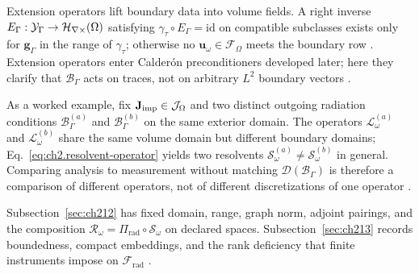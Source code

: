 Extension operators lift boundary data into volume fields. A right inverse \(E_\Gamma:\mathcal{Y}_\Gamma\to\mathcal{H}_{\nabla\times}(\Omega)\) satisfying \(\gamma_\tau\circ E_\Gamma=\mathrm{id}\) on compatible subclasses exists only for \(\mathbf{g}_\Gamma\) in the range of \(\gamma_\tau\); otherwise no \(\mathbf{u}_\omega\in\mathcal{F}_\Omega\) meets the boundary row \cite{stratton1941}. Extension operators enter Calder\'on preconditioners developed later; here they clarify that \(\mathcal{B}_\Gamma\) acts on traces, not on arbitrary \(L^{2}\) boundary vectors \cite{harrington2001}.

As a worked example, fix \(\mathbf{J}_{\mathrm{imp}}\in\mathcal{J}_\Omega\) and two distinct outgoing radiation conditions \(\mathcal{B}_\Gamma^{(a)}\) and \(\mathcal{B}_\Gamma^{(b)}\) on the same exterior domain. The operators \(\mathcal{L}_\omega^{(a)}\) and \(\mathcal{L}_\omega^{(b)}\) share the same volume domain but different boundary domains; Eq.~\eqref{eq:ch2.resolvent-operator} yields two resolvents \(\mathcal{S}_\omega^{(a)}\neq\mathcal{S}_\omega^{(b)}\) in general. Comparing analysis to measurement without matching \(\mathcal{D}(\mathcal{B}_\Gamma)\) is therefore a comparison of different operators, not of different discretizations of one operator \cite{stratton1941}.

Subsection~\ref{sec:ch212} has fixed domain, range, graph norm, adjoint pairings, and the composition \(\mathcal{R}_\omega=\Pi_{\mathrm{rad}}\circ\mathcal{S}_\omega\) on declared spaces. Subsection~\ref{sec:ch213} records boundedness, compact embeddings, and the rank deficiency that finite instruments impose on \(\mathcal{F}_{\mathrm{rad}}\) \cite{stratton1941}.
